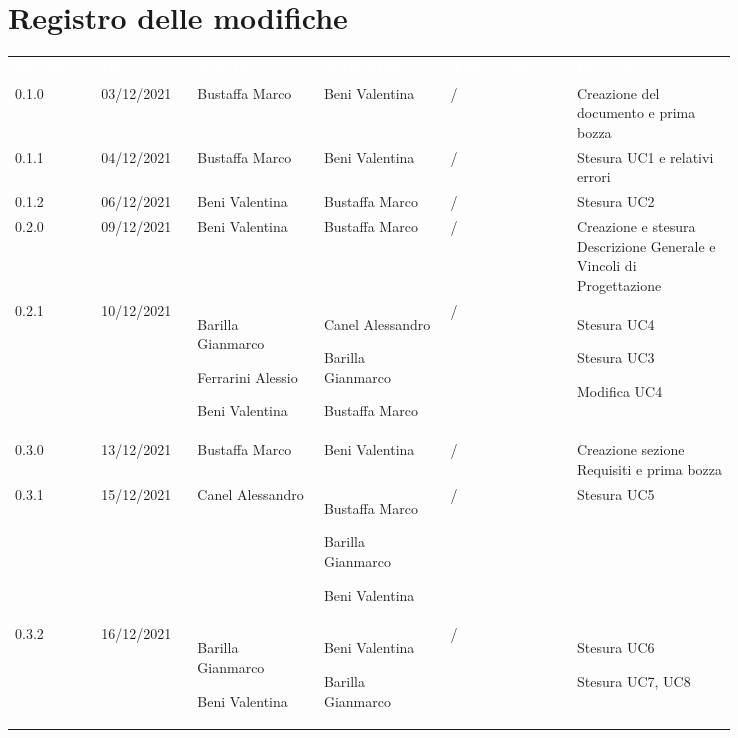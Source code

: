 \section*{Registro delle modifiche}

{\renewcommand{\arraystretch}{1.5}
\scriptsize
\begin{tabular}{p{0.10\linewidth}p{0.10\linewidth}p{0.15\linewidth}p{0.15\linewidth}p{0.15\linewidth}p{0.19\linewidth}}
	\rowcolor[RGB]{33, 73, 50}
	\textcolor{white}{\textbf{Versione}} & \textcolor{white}{\textbf{Data}} &
	\textcolor{white}{\textbf{Redattore}} & \textcolor{white}{\textbf{Verificatore}} &
	\textcolor{white}{\textbf{Approvatore}} & \textcolor{white}{\textbf{Descrizione}}\\
	\rowcolor[RGB]{216, 235, 171}
	0.1.0 & 03/12/2021 & Bustaffa Marco& Beni Valentina &/& Creazione del documento e prima bozza\\
	\rowcolor[RGB]{233, 245, 206}
	0.1.1 & 04/12/2021 & Bustaffa Marco& Beni Valentina &/& Stesura UC1 e relativi errori\\
	\rowcolor[RGB]{216, 235, 171}
	0.1.2 & 06/12/2021 & Beni Valentina& Bustaffa Marco &/& Stesura UC2\\
	\rowcolor[RGB]{233, 245, 206}
	0.2.0 & 09/12/2021 & Beni Valentina& Bustaffa Marco &/& Creazione e stesura Descrizione Generale e Vincoli di Progettazione\\
	\rowcolor[RGB]{216, 235, 171}
	0.2.1 & 10/12/2021 & Barilla Gianmarco \par Ferrarini Alessio \par Beni Valentina& Canel Alessandro \par Barilla Gianmarco \par Bustaffa Marco&/& Stesura UC4 \par Stesura UC3 \par Modifica UC4 \\
	\rowcolor[RGB]{233, 245, 206}
	0.3.0 & 13/12/2021 & Bustaffa Marco& Beni Valentina &/& Creazione sezione Requisiti e prima bozza\\
	\rowcolor[RGB]{216, 235, 171}
	0.3.1 & 15/12/2021 & Canel Alessandro& Bustaffa Marco \par Barilla Gianmarco \par Beni Valentina&/& Stesura UC5\\
	\rowcolor[RGB]{233, 245, 206}
	0.3.2 & 16/12/2021 & Barilla Gianmarco \par Beni Valentina& Beni Valentina \par Barilla Gianmarco &/& Stesura UC6 \par Stesura UC7, UC8\\

\end{tabular}}
